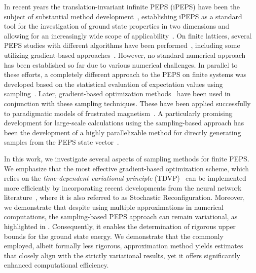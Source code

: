 \documentclass[aps,notitlepage,twocolumn,nofootinbib,superscriptaddress,pra,10pt]{revtex4-2}
\begin{document}
In recent years the translation-invariant infinite PEPS (iPEPS) have been the subject of substantial method development~\cite{Jordan08_iPEPS,Corboz14_iPEPS,Corboz16_variational,Vanderstraeten16_gradient,Liao19_AD_PEPS}, establishing iPEPS as a standard tool for the investigation of ground state properties in two dimensions and allowing for an increasingly wide scope of applicability~\cite{Liao17_iPEPS_appl, Niesen17_iPEPS_appl, Chen18_iPEPS_appl, Chung19_iPEPS_appl, Ponsioen19_iPEPS_appl, lee2020_iPEPS_appl, Gauthe20_iPEPS_appl, Hasik22_CSL, Peschke22_iPEPS_appl, Ponsioen23_iPEPS_appl, Ponsioen23_iPEPS_appl2, Weerda24_FQH, Hasik24_iPEPS_appl, schmoll2024_iPEPS_appl}.
On finite lattices, several PEPS studies with different algorithms have been performed~\cite{Murg07fPEPS,Murg09fPEPS,Lubasch_2014fPEPS,Lubasch2014fPEPS}, including some utilizing gradient-based approaches~\cite{Noack23_Hubbard_fPEPS,ORourke2023_Rydberg_entanglement, Gray2018}. However, no standard numerical approach has been established so far due to various numerical challenges.
In parallel to these efforts, a completely different approach to the PEPS on finite systems was developed based on the statistical evaluation of expectation values using sampling~\cite{Wang2011_sampling_TN}. 
Later, gradient-based optimization methods~\cite{Liu2017_gradient_fPEPS,liu2025accurate} have been used in conjunction with these sampling techniques. These have been applied successfully to paradigmatic models of frustrated magnetism~\cite{Liu2018_fPEPS_SL, Liu2021_accurate_fPEPS, LIU2022_fPEPS}. 
A particularly promising development for large-scale calculations using the sampling-based approach has been the development of a highly parallelizable method for directly generating samples from the PEPS state vector~\cite{Vieijra21_directsampling_PEPS}.

In this work, we investigate several aspects of sampling methods for finite PEPS. 
We emphasize that the most effective gradient-based optimization scheme, which relies on the \textit{time-dependent variational principle} (TDVP)~\cite{sorella2007weak, haegeman2011time, Carleo17_NQS, Vanderstraeten19TDVP}
can be implemented more efficiently by incorporating recent developments from the neural network literature~\cite{chen2024minSR}, where it is also referred to as Stochastic Reconfiguration.
Moreover, we demonstrate that despite using multiple approximations in numerical computations, the sampling-based PEPS approach can remain variational, as highlighted in \cite{liu2024tensor}. 
Consequently, it enables the determination of rigorous upper bounds for the ground state energy.
We demonstrate that the commonly employed, albeit formally less rigorous, approximation method yields estimates that closely align with the strictly variational results, yet it offers significantly enhanced computational efficiency.
\end{document}
